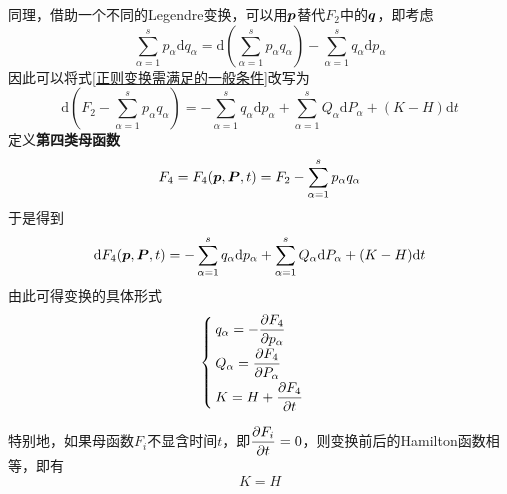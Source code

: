 同理，借助一个不同的Legendre变换，可以用$\boldsymbol{p}$替代$F_2$中的$\boldsymbol{q}$，即考虑
\begin{equation*}
	\sum_{\alpha=1}^s p_\alpha \mathrm{d} q_\alpha = \mathrm{d} \left(\sum_{\alpha=1}^s p_\alpha q_\alpha\right) - \sum_{\alpha=1}^s q_\alpha \mathrm{d} p_\alpha
\end{equation*}
因此可以将式\eqref{正则变换需满足的一般条件}改写为
\begin{equation*}
	\mathrm{d} \left(F_2 - \sum_{\alpha=1}^s p_\alpha q_\alpha\right) = -\sum_{\alpha=1}^s q_\alpha \mathrm{d} p_\alpha + \sum_{\alpha=1}^s Q_\alpha \mathrm{d} P_\alpha + (K-H) \mathrm{d} t
\end{equation*}
定义{\bf 第四类母函数}
\begin{equation}
	F_4 = F_4(\boldsymbol{p},\boldsymbol{P},t) = F_2 - \sum_{\alpha=1}^s p_\alpha q_\alpha
	\label{第四类母函数}
\end{equation}
于是得到
\begin{equation}
	\mathrm{d} F_4(\boldsymbol{p},\boldsymbol{P},t) = -\sum_{\alpha=1}^s q_\alpha \mathrm{d} p_\alpha + \sum_{\alpha=1}^s Q_\alpha \mathrm{d} P_\alpha + (K-H) \mathrm{d} t
	\label{第四类母函数下的正则变换}
\end{equation}
由此可得变换的具体形式
\begin{equation}
	\begin{cases}
		\displaystyle q_\alpha = -\frac{\partial F_4}{\partial p_\alpha} \\[1.5ex]
		\displaystyle Q_\alpha = \frac{\partial F_4}{\partial P_\alpha} \\[1.5ex]
		\displaystyle K = H + \frac{\partial F_4}{\partial t}
	\end{cases}
\end{equation}

特别地，如果母函数$F_i$不显含时间$t$，即$\dfrac{\partial F_i}{\partial t} = 0$，则变换前后的Hamilton函数相等，即有
\begin{equation*}
	K=H
\end{equation*}

